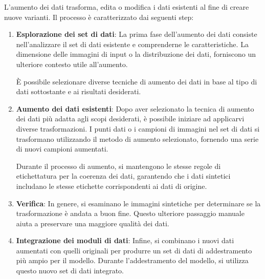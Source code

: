 \documentclass[12pt,a4paper,openright,twoside]{book}
\begin{document}
L'aumento dei dati trasforma, edita o modifica i dati esistenti al fine di creare nuove varianti. Il processo è caratterizzato dai seguenti step:
\begin{enumerate}
\item \textbf{Esplorazione dei set di dati}:
La prima fase dell'aumento dei dati consiste nell'analizzare il set di dati esistente e comprenderne le caratteristiche. La dimensione delle immagini di input o la distribuzione dei dati, forniscono un ulteriore contesto utile all'aumento. 

È possibile selezionare diverse tecniche di aumento dei dati in base al tipo di dati sottostante e ai risultati desiderati.

\item \textbf{Aumento dei dati esistenti}:
Dopo aver selezionato la tecnica di aumento dei dati più adatta agli scopi desiderati, è possibile iniziare ad applicarvi diverse trasformazioni. I punti dati o i campioni di immagini nel set di dati si trasformano utilizzando il metodo di aumento selezionato, fornendo una serie di nuovi campioni aumentati. 

Durante il processo di aumento, si mantengono le stesse regole di etichettatura per la coerenza dei dati, garantendo che i dati sintetici includano le stesse etichette corrispondenti ai dati di origine.

\item \textbf{Verifica}:
In genere, si esaminano le immagini sintetiche per determinare se la trasformazione è andata a buon fine. Questo ulteriore passaggio manuale aiuta a preservare una maggiore qualità dei dati. 

\item \textbf{Integrazione dei moduli di dati}:
Infine, si combinano i nuovi dati aumentati con quelli originali per produrre un set di dati di addestramento più ampio per il modello. Durante l'addestramento del modello, si utilizza questo nuovo set di dati integrato.
\end{enumerate}
\end{document}
